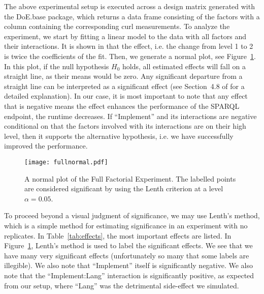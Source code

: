 \documentclass{llncs}
\begin{document}
The above experimental setup is executed across a design matrix
generated with the DoE.base package, which returns a data frame
consisting of the factors with a column containing the corresponding
curl measurements. To analyze the experiment, we start by fitting a
linear model to the data with all factors and their interactions. It
is shown in \cite{wu2009experiments} that the effect, i.e. the change
from level 1 to 2 is twice the coefficients of the fit. Then, we
generate a normal plot, see Figure~\ref{fig:fullnormal}. In this plot,
if the null hypothesis $H_0$ holds, all estimated effects will fall on
a straight line, as their means would be zero. Any significant
departure from a straight line can be interpreted as a significant
effect (see Section~4.8 of \cite{wu2009experiments} for a detailed
explanation). In our case, it is most important to note that any
effect that is negative means the effect enhances the performance of
the SPARQL endpoint, the runtime decreases. If ``Implement'' and its
interactions are negative conditional on that the factors involved
with its interactions are on their high level, then it supports the
alternative hypothesis, i.e. we have successfully improved the
performance.

\begin{figure}[t]
  \centerline{%
  \texttt{[image: fullnormal.pdf]}}
  \caption{A normal plot of the Full Factorial Experiment. The
    labelled points are considered significant by using the Lenth
    criterion at a level $\alpha=0.05$.}\label{fig:fullnormal}
\end{figure}


To proceed beyond a visual judgment of significance, we may use
Lenth's method\cite{lenthmethod}, which is a simple method for
estimating significance in an experiment with no replicates. In
Table~\ref{tab:effects}, the most important effects are listed.  In
Figure~\ref{fig:fullnormal}, Lenth's method is used to label the
significant effects. We see that we have many very significant effects
(unfortunately so many that some labels are illegible). We also note that
``Implement'' itself is significantly negative. We also note that the
``Implement:Lang'' interaction is significantly positive, as expected
from our setup, where ``Lang'' was the detrimental side-effect we
simulated.
\end{document}
